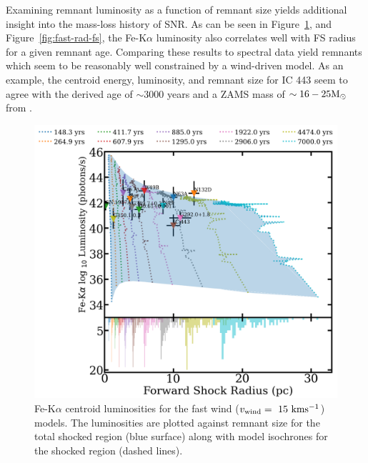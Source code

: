 \documentclass[twocolumn]{aastex631}
\begin{document}
Examining remnant luminosity as a function of remnant size yields additional insight into the mass-loss history of SNR. As can be seen in Figure~\ref{fig:slow-rad-fs}, and Figure~\ref{fig:fast-rad-fs}, the Fe-K$\alpha$ luminosity also correlates well with FS radius for a given remnant age. Comparing these results to spectral data yield remnants which seem to be reasonably well constrained by a wind-driven model. As an example, the centroid energy, luminosity, and remnant size for IC 443 seem to agree with the derived age of $\sim 3000$ years and a ZAMS mass of $\sim 16-25 \rm M_{\odot}$ from  \citet{troja08}. 
\begin{figure}[htb]
    \centering
    \includegraphics[scale=0.21]{fsradfast.png}
    \caption{Fe-K$\alpha$ centroid luminosities for the fast wind ($v_{\rm wind}=~15~\rm kms^{-1}$) models. The luminosities are plotted against remnant size for the total shocked region (blue surface) along with model isochrones for the shocked region (dashed lines).}
    \label{fig:slow-rad-fs}
\end{figure}
\end{document}
